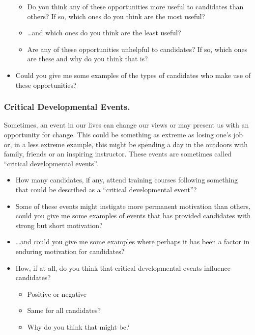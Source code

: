 \documentclass[
  12pt,
  a4paper,
]{book}
\providecommand{\tightlist}{%
  \setlength{\itemsep}{0pt}\setlength{\parskip}{0pt}}
\begin{document}
\begin{itemize}
  \begin{itemize}
  \tightlist
  \item
    Do you think any of these opportunities more useful to candidates than others? If so, which ones do you think are the most useful?
  \item
    \ldots and which ones do you think are the least useful?
  \item
    Are any of these opportunities unhelpful to candidates? If so, which ones are these and why do you think that is?
  \end{itemize}
\item
  Could you give me some examples of the types of candidates who make use of these opportunities?
\end{itemize}

\hypertarget{critical-developmental-events.}{%
\subsubsection{Critical Developmental Events.}\label{critical-developmental-events.}}

Sometimes, an event in our lives can change our views or may present us with an opportunity for change. This could be something as extreme as losing one's job or, in a less extreme example, this might be spending a day in the outdoors with family, friends or an inspiring instructor. These events are sometimes called ``critical developmental events''.

\begin{itemize}
\tightlist
\item
  How many candidates, if any, attend training courses following something that could be described as a ``critical developmental event''?
\item
  Some of these events might instigate more permanent motivation than others, could you give me some examples of events that has provided candidates with strong but short motivation?
\item
  \ldots and could you give me some examples where perhaps it has been a factor in enduring motivation for candidates?
\item
  How, if at all, do you think that critical developmental events influence candidates?

  \begin{itemize}
  \tightlist
  \item
    Positive or negative
  \item
    Same for all candidates?
  \item
    Why do you think that might be?
  \end{itemize}
\end{itemize}
\end{document}
